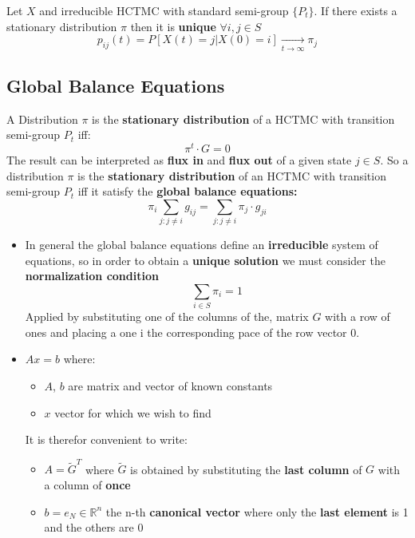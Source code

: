 \begin{tcolorbox}
Let $X$ and irreducible HCTMC with standard semi-group $\{P_t\}$. If there exists a stationary distribution $\pi$ then it is \textbf{unique} $\forall i,j \in S$
$$p_{ij}(t) = P[X(t) = j | X(0) = i] \xrightarrow[t \rightarrow \infty]{} \pi_j$$
\end{tcolorbox}

\subsection{Global Balance Equations}
A Distribution $\pi$ is the \textbf{stationary distribution} of a HCTMC with transition semi-group $P_t$ iff:
$$\pi^t \cdot G = 0$$
The result can be interpreted as \textbf{flux in} and \textbf{flux out} of a given state $j \in S$. So a distribution $\pi$ is the \textbf{stationary distribution} of an HCTMC with transition semi-group $P_t$ iff it satisfy the \textbf{global balance equations:}
$$\pi_i \sum_{j:j \neq i}g_{ij} = \sum_{j:j \neq i}\pi_j \cdot g_{ji}$$

\begin{itemize}
    \item In general the global balance equations define an \textbf{irreducible} system of equations, so in order to obtain a \textbf{unique solution} we must consider the \textbf{normalization condition}
    $$\sum_{i \in S} \pi_i = 1$$
    Applied by substituting one of the columns of the, matrix $G$ with a row of ones and placing a one i the corresponding pace of the row vector 0.
    \item $Ax = b$ where:
    \begin{itemize}
        \item $A$, $b$ are matrix and vector of known constants
        \item $x$ vector for which we wish to find
    \end{itemize}
    It is therefor convenient to write:
    \begin{itemize}
        \item $A = \tilde{G}^T$ where $\tilde{G}$ is obtained by substituting the \textbf{last column} of $G$ with a column of \textbf{once}
        \item $b = e_N \in \mathbb{R}^n$ the n-th \textbf{canonical vector} where only the \textbf{last element} is 1 and the others are 0
    \end{itemize}
\end{itemize}

